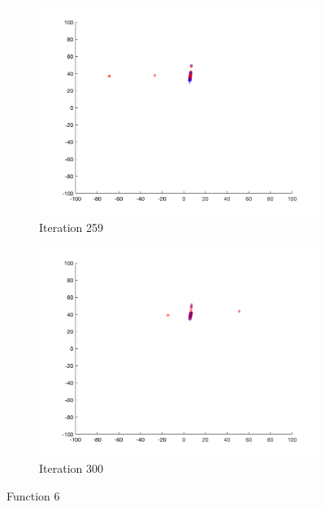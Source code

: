 \begin{figure}
\begin{subfigure}[b]{0.4\textwidth}
    \includegraphics[width=\textwidth]{img/smpl/rosn2d-9-100/loa-iter-259}
    \caption{Iteration 259}
    \label{fig:s6-iter-6}
  \end{subfigure}
  \begin{subfigure}[b]{0.4\textwidth}
    \includegraphics[width=\textwidth]{img/smpl/rosn2d-9-100/loa-iter-300}
    \caption{Iteration 300}
    \label{fig:s6-iter-7}
  \end{subfigure}
  \caption{Function 6}
\end{figure}
